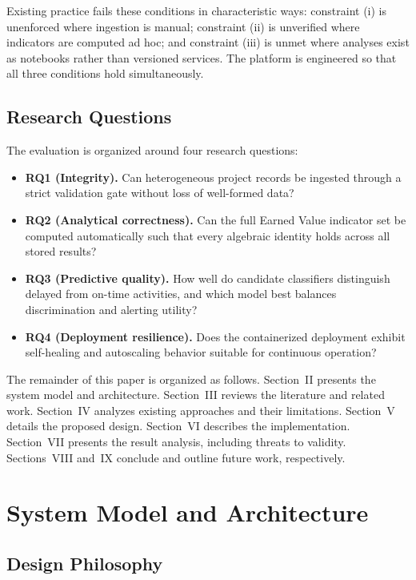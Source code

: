 \documentclass[conference]{IEEEtran}
\begin{document}
Existing practice fails these conditions in characteristic ways: constraint (i) is unenforced where ingestion is manual; constraint (ii) is unverified where indicators are computed ad hoc; and constraint (iii) is unmet where analyses exist as notebooks rather than versioned services. The platform is engineered so that all three conditions hold simultaneously.

\subsection{Research Questions}

The evaluation is organized around four research questions:
\begin{itemize}
  \item \textbf{RQ1 (Integrity).} Can heterogeneous project records be ingested through a strict validation gate without loss of well-formed data?
  \item \textbf{RQ2 (Analytical correctness).} Can the full Earned Value indicator set be computed automatically such that every algebraic identity holds across all stored results?
  \item \textbf{RQ3 (Predictive quality).} How well do candidate classifiers distinguish delayed from on-time activities, and which model best balances discrimination and alerting utility?
  \item \textbf{RQ4 (Deployment resilience).} Does the containerized deployment exhibit self-healing and autoscaling behavior suitable for continuous operation?
\end{itemize}

The remainder of this paper is organized as follows. Section~II presents the system model and architecture. Section~III reviews the literature and related work. Section~IV analyzes existing approaches and their limitations. Section~V details the proposed design. Section~VI describes the implementation. Section~VII presents the result analysis, including threats to validity. Sections~VIII and~IX conclude and outline future work, respectively.

\section{System Model and Architecture}

\subsection{Design Philosophy}
\end{document}

